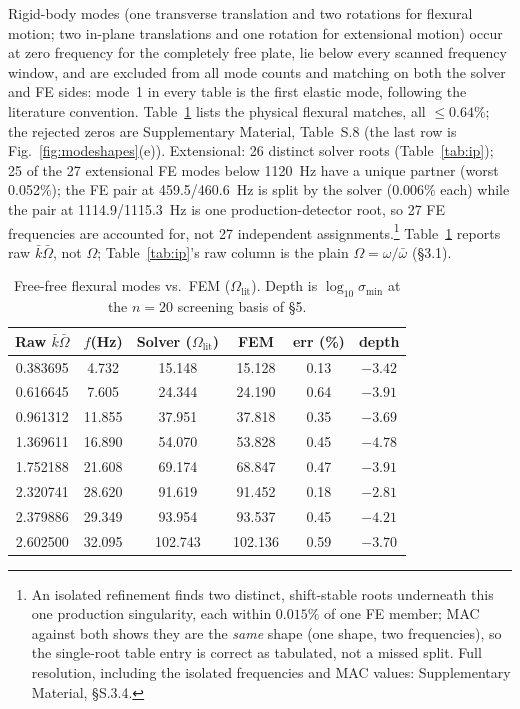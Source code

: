 \documentclass[11pt]{article}
\begin{document}
Rigid-body modes (one transverse translation and two rotations for
flexural motion; two in-plane translations and one rotation for
extensional motion) occur at zero frequency for the completely free
plate, lie below every scanned frequency window, and are excluded from
all mode counts and matching on both the solver and FE sides: mode~1 in
every table is the first elastic mode, following the literature
convention.
Table~\ref{tab:oop} lists the physical flexural matches, all
$\le 0.64\%$; the rejected zeros are Supplementary Material, Table~S.8
(the last row is Fig.~\ref{fig:modeshapes}(e)). Extensional: 26 distinct
solver roots (Table~\ref{tab:ip}); 25 of the 27 extensional FE modes
below 1120~Hz have a unique partner (worst 0.052\%); the FE pair at
459.5/460.6~Hz is split by the solver (0.006\% each) while the pair at
1114.9/1115.3~Hz is one production-detector root, so 27 FE frequencies
are accounted for, not 27 independent assignments.\footnote{An isolated
refinement finds two distinct, shift-stable roots underneath this one
production singularity, each within $0.015\%$ of one FE member; MAC
against both shows they are the \emph{same} shape (one shape, two
frequencies), so the single-root table entry is correct as tabulated,
not a missed split. Full resolution, including the isolated frequencies
and MAC values: Supplementary Material, §S.3.4.}
Table~\ref{tab:oop} reports raw $\bar k\bar\Omega$, not $\Omega$;
Table~\ref{tab:ip}'s raw column is the plain
$\Omega=\omega/\bar\omega$ (\S3.1).

\begin{table}[!htbp]\centering\footnotesize
\caption{Free-free flexural modes vs.\ FEM ($\Omega_{\mathrm{lit}}$).
Depth is $\log_{10}\sigma_{\min}$ at the $n{=}20$ screening basis of \S5.}
\label{tab:oop}
\begin{tabular}{cccccc}
\toprule Raw $\bar k\bar\Omega$ & $f$(Hz) & Solver ($\Omega_{\mathrm{lit}}$) & FEM & err (\%) & depth\\ \midrule
0.383695 & 4.732 & 15.148 & 15.128 & 0.13 & $-3.42$\\
0.616645 & 7.605 & 24.344 & 24.190 & 0.64 & $-3.91$\\
0.961312 & 11.855 & 37.951 & 37.818 & 0.35 & $-3.69$\\
1.369611 & 16.890 & 54.070 & 53.828 & 0.45 & $-4.78$\\
1.752188 & 21.608 & 69.174 & 68.847 & 0.47 & $-3.91$\\
2.320741 & 28.620 & 91.619 & 91.452 & 0.18 & $-2.81$\\
2.379886 & 29.349 & 93.954 & 93.537 & 0.45 & $-4.21$\\
2.602500 & 32.095 & 102.743 & 102.136 & 0.59 & $-3.70$\\ \bottomrule
\end{tabular}
\end{table}
\end{document}

